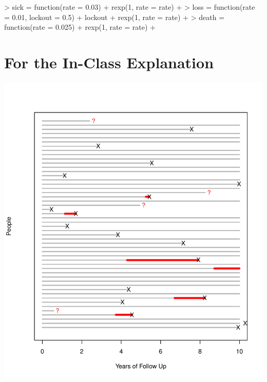 \documentclass{article}
\begin{document}
\begin{Schunk}
\begin{Sinput}
> sick = function(rate = 0.03) {
+     rexp(1, rate = rate)
+ }
> loss = function(rate = 0.01, lockout = 0.5) {
+     lockout + rexp(1, rate = rate)
+ }
> death = function(rate = 0.025) {
+     rexp(1, rate = rate)
+ }
\end{Sinput}
\end{Schunk}

\section{For the In-Class Explanation}
\includegraphics{incidence-graphs-inclass}
\end{document}
